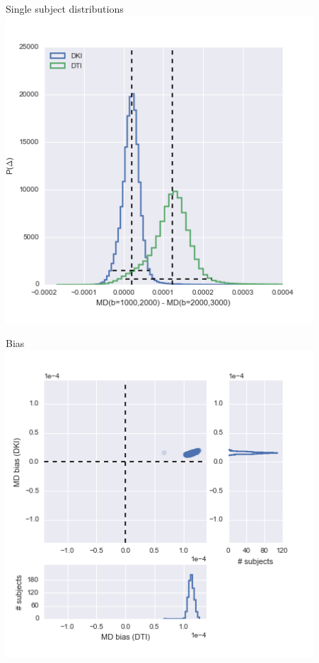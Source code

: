 \documentclass[a0, landscape]{a0poster}
\begin{document}
\begin{multicols}{3}
\begin{minipage}[b]{1\linewidth}
  \begin{minipage}[b]{0.33\linewidth}
  \center Single subject distributions\\
  \includegraphics[width=11.5cm]{reliability_singleton_md.png}
  \end{minipage}
  \begin{minipage}[b]{0.33\linewidth}
    \center Bias\\
    \includegraphics[width=11.5cm]{md_bias.png}

\end{minipage}
\end{minipage}
\end{multicols}
\end{document}
